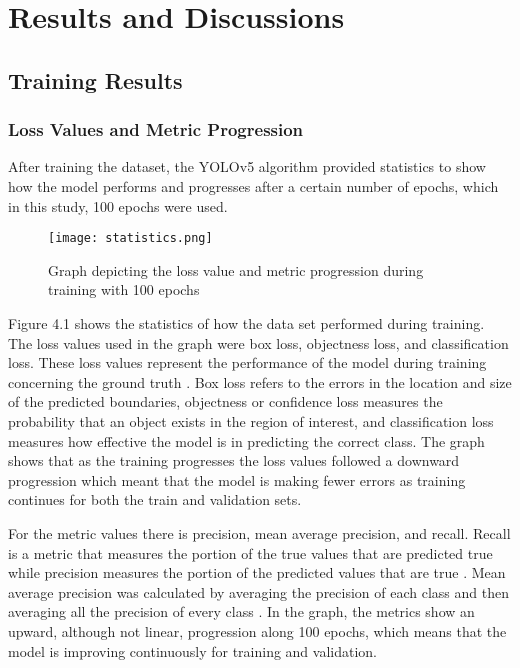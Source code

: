 \chapter{Results and Discussions}
 
\section{Training Results}

\subsection{Loss Values and Metric Progression}
After training the dataset, the YOLOv5 algorithm provided statistics to show how the model performs and progresses after a certain number of epochs, which in this study, 100 epochs were used.

\begin{figure}[!htbp]
	\texttt{[image: statistics.png]}
	\caption{Graph depicting the loss value and metric progression during training with 100 epochs}
	\label{fig:graph}
\end{figure}
\FloatBarrier

Figure 4.1 shows the statistics of how the data set performed during training. The loss values used in the graph were box loss, objectness loss, and classification loss. These loss values represent the performance of the model during training concerning the ground truth \cite{
Hui_2022}. Box loss refers to the errors in the location and size of the predicted boundaries, objectness or confidence loss measures the probability that an object exists in the region of interest, and classification loss measures how effective the model is in predicting the correct class. The graph shows that as the training progresses the loss values followed a downward progression which meant that the model is making fewer errors as training continues for both the train and validation sets.

For the metric values there is precision, mean average precision, and recall. Recall is a metric that measures the portion of the true values that are predicted true while precision measures the portion of the predicted values that are true \cite{D_Powers}. Mean average precision was calculated by averaging the precision of each class and then averaging all the precision of every class \cite{Shah_2022}. In the graph, the metrics show an upward, although not linear, progression along 100 epochs, which means that the model is improving continuously for training and validation. 
 

